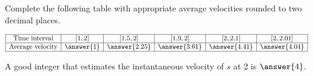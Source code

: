 \documentclass{ximera}
\begin{document}
\begin{exercise}
\begin{exercise}
\begin{exercise}
\begin{exercise}
Complete the following table with appropriate average velocities rounded to two decimal places.

\[ \begin{array}{|c|c|c|c|c|c|}
	\hline
	\text{Time interval} & \left[1,2\right] & \left[1.5,2\right] & \left[1.9,2\right] & \left[2,2.1\right] & \left[2,2.01\right]\\\hline
	\text{Average velocity} & \answer{1} & \answer{2.25} & \answer{3.61} & \answer{4.41} & \answer{4.04} \\\hline
\end{array}\]

A good integer that estimates the instantaneous velocity of $s$ at 2 is $\answer{4}$.

\end{exercise}
\end{exercise}
\end{exercise}
\end{exercise}
\end{document}
